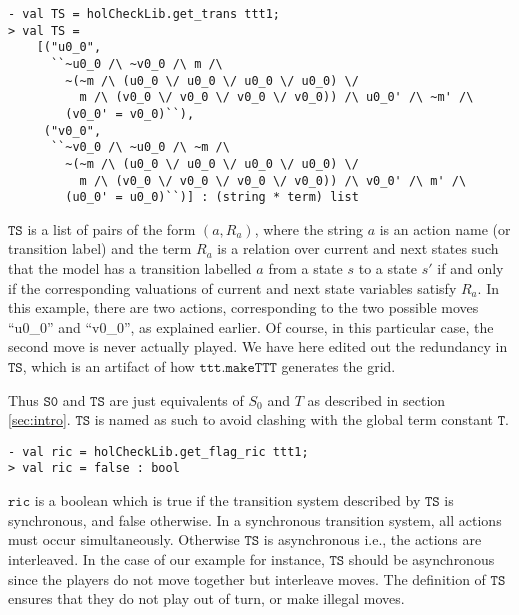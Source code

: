 \begin{session}\begin{verbatim}
- val TS = holCheckLib.get_trans ttt1;
> val TS =
    [("u0_0",
      ``~u0_0 /\ ~v0_0 /\ m /\
        ~(~m /\ (u0_0 \/ u0_0 \/ u0_0 \/ u0_0) \/
          m /\ (v0_0 \/ v0_0 \/ v0_0 \/ v0_0)) /\ u0_0' /\ ~m' /\
        (v0_0' = v0_0)``),
     ("v0_0",
      ``~v0_0 /\ ~u0_0 /\ ~m /\
        ~(~m /\ (u0_0 \/ u0_0 \/ u0_0 \/ u0_0) \/
          m /\ (v0_0 \/ v0_0 \/ v0_0 \/ v0_0)) /\ v0_0' /\ m' /\
        (u0_0' = u0_0)``)] : (string * term) list
\end{verbatim}\end{session}
\(\mathtt{TS}\) is a list of pairs of the form \( (a,R_a)\), where the string \(a\) is an action name (or transition label) and the \HOL{} term \(R_a\) is a relation over current and next states such that the model has a transition labelled \(a\) from a state \( s \) to a state \(s'\) if and only if the corresponding valuations of current and next state variables satisfy \( R_a \). In this example, there are two actions, corresponding to the two possible moves ``u0\_0'' and ``v0\_0'', as explained earlier. Of course, in this particular case, the second move is never actually played. We have here edited out the redundancy in \(\mathtt{TS}\), which is an artifact of how \(\mathtt{ttt.makeTTT}\) generates the grid.

Thus \(\mathtt{S0}\) and \(\mathtt{TS}\) are just \HOL{} equivalents of \(S_0\) and \(T\) as described in section \ref{sec:intro}. \( \mathtt{TS} \) is named as such to avoid clashing with the global \HOL{} term constant \( \mathtt{T} \).

\begin{session}\begin{verbatim}
- val ric = holCheckLib.get_flag_ric ttt1;
> val ric = false : bool
\end{verbatim}\end{session}
\(\mathtt{ric}\) is a boolean which is true if the transition system described by \(\mathtt{TS}\) is synchronous, and false otherwise. In a synchronous transition system, all actions must occur simultaneously. Otherwise \(\mathtt{TS}\) is asynchronous i.e., the actions are interleaved. In the case of our example for instance, \( \mathtt{TS} \) should be asynchronous since the players do not move together but interleave moves. The definition of \( \mathtt{TS} \) ensures that they do not play out of turn, or make illegal moves.

